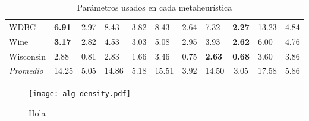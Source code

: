 \begin{table}[h!]
\begin{tabular}{l g c g c g c g c g c}
WDBC         & \textbf{6.91} &  2.97 &  8.43 & 3.82 &  8.43 & 2.64 &  7.32 & \textbf{2.27} & 13.23 &  4.84 \\
Wine         & \textbf{3.17} &  2.82 &  4.53 & 3.03 &  5.08 & 2.95 &  3.93 & \textbf{2.62} &  6.00 &  4.76 \\
Wisconsin    &  2.88 &  0.81 &  2.83 & 1.66 &  3.46 & 0.75 & \textbf{2.63} & \textbf{0.68} &  3.60 &  3.86 \\
\hline
\emph{Promedio} & 14.25 & 5.05 & 14.86 & 5.18 & 15.51 & 3.92 & 14.50 & 3.05 & 17.58 & 5.86\\
\hline
\end{tabular}
\caption{Parámetros usados en cada metaheurística}
\label{res-all}
\end{table}

\begin{figure}[h!]
\centering
\texttt{[image: alg-density.pdf]}
\caption{Hola}
\label{fig-alg-density}
\end{figure}
